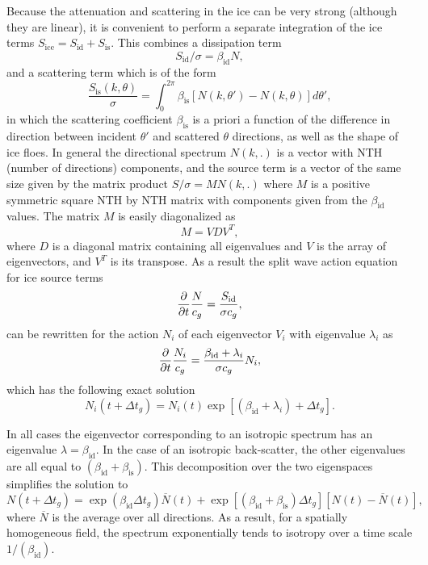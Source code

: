 Because the attenuation and scattering in the ice can be very strong (although they are linear), it is convenient 
to perform a separate integration of the ice terms $S_{\mathrm{ice}}=S_{\mathrm{id}}+S_{\mathrm{is}}$. This combines 
a dissipation term 
\begin{equation}
S_{\mathrm{id}}/\sigma  = \beta_{\mathrm{id}} N ,
\end{equation}
 and a scattering term 
which is of the form 
\begin{equation}
 \frac{S_{\mathrm{is}}(k,\theta)}{\sigma} =  \int_0^{2\pi}\beta_{\mathrm{is}} [N(k,\theta')-N(k,\theta)] d\theta'  ,
 \end{equation}
 in which the scattering coefficient $\beta_{\mathrm{is}}$ is a priori a function of the difference in direction between 
 incident $\theta'$ and scattered $\theta$ directions, as well as the shape of ice floes. In general 
  the directional spectrum $N(k,.)$ is a vector with {\F NTH} (number of directions) components, 
and the source term is a vector of the same size  given by the matrix product $S/\sigma = M N(k,.)$ where  
$M$ is a positive symmetric square {\F NTH} by {\F NTH} matrix with components given from the $\beta_{\mathrm{id}}$ values.
The matrix $M$ is easily diagonalized as 
\begin{equation}
 M  =  V D V^T  ,
 \end{equation}
 where $D$ is a diagonal matrix containing all eigenvalues and $V$ is the array of eigenvectors, 
 and $V^T$ is its transpose. As a result the split wave action equation for ice source terms 
 \begin{equation}
\frac{\partial}{\partial t} \frac{N}{c_g}   = \frac{S_{\mathrm{id}}}{\sigma c_g} ,
 \end{equation}
 can be rewritten for the action $N_i$ of each eigenvector $V_i$ with eigenvalue $\lambda_i$ as 
  \begin{equation}
\frac{\partial}{\partial t} \frac{N_i}{c_g}   = \frac{\beta_{\mathrm{id}} + \lambda_i}{\sigma c_g} N_i ,
 \end{equation}
 which has the following exact solution 
   \begin{equation}
 {N_i}(t+\Delta t_g)   = N_i(t) \exp \left[ (\beta_{\mathrm{id}} + \lambda_i) +\Delta t_g\right].
 \end{equation}
 
 In all cases the eigenvector corresponding to an isotropic spectrum has an eigenvalue $\lambda=\beta_{\mathrm{id}}$. 
 In the case of an isotropic back-scatter, the other eigenvalues are all equal to $(\beta_{\mathrm{id}} + \beta_{\mathrm{is}})$. 
 This decomposition over the two eigenspaces simplifies the solution to 
\begin{equation}
 N(t+\Delta t_g) = \exp(\beta_{\mathrm{id}} \Delta t_g) \overline{N}(t)  + \exp \left[\left(\beta_{\mathrm{id}} + \beta_{\mathrm{is}}\right) \Delta t_g\right] \left[N(t)-\overline{N}(t)\right]
, \label{eq:exact_st_ice} \end{equation}
where $\overline{N}$ is the average over all directions. As a result, for a spatially homogeneous field, 
the spectrum exponentially tends to isotropy over a time scale $1/(\beta_{\mathrm{id}})$.
